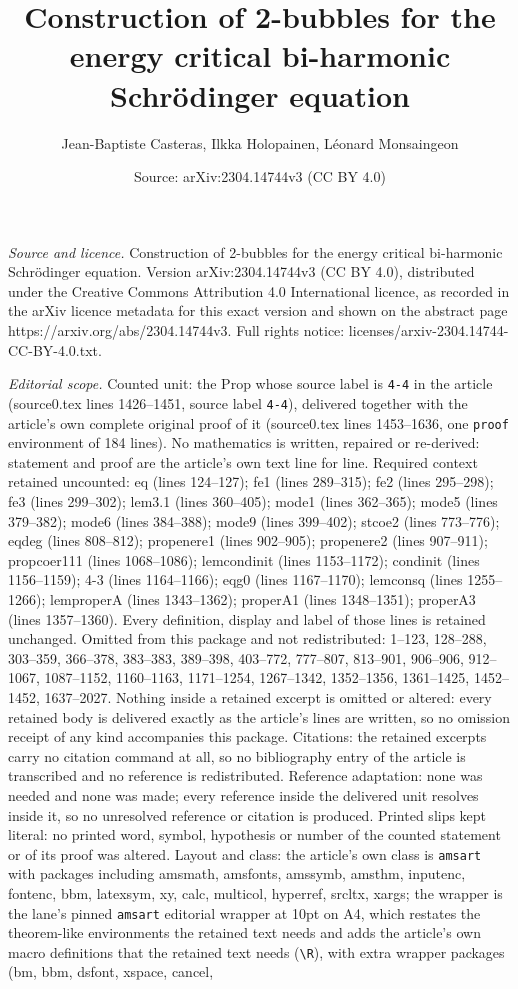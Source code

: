 \documentclass[10pt,a4paper]{amsart}
\title[Construction of 2-bubbles for the energy critical bi-harmoni]{Construction of 2-bubbles for the energy critical bi-harmonic Schr\"odinger equation}
\author{Jean-Baptiste Casteras, Ilkka Holopainen, L\'eonard Monsaingeon}
\date{Source: arXiv:2304.14744v3 (CC BY 4.0)}
\begin{document}
\maketitle

\noindent\emph{Source and licence.} Construction of 2-bubbles for the energy critical bi-harmonic Schr\"odinger equation. Version arXiv:2304.14744v3 (CC BY 4.0), distributed under the Creative Commons Attribution 4.0 International licence, as recorded in the arXiv licence metadata for this exact version and shown on the abstract page https://arxiv.org/abs/2304.14744v3. Full rights notice: licenses/arxiv-2304.14744-CC-BY-4.0.txt.\par\smallskip

\noindent\textit{Editorial scope.} Counted unit: the Prop whose source label is \texttt{4-4} in the article (source0.tex lines 1426--1451, source label \texttt{4-4}), delivered together with the article's own complete original proof of it (source0.tex lines 1453--1636, one \texttt{proof} environment of 184 lines). No mathematics is written, repaired or re-derived: statement and proof are the article's own text line for line. Required context retained uncounted: eq (lines 124--127); fe1 (lines 289--315); fe2 (lines 295--298); fe3 (lines 299--302); lem3.1 (lines 360--405); mode1 (lines 362--365); mode5 (lines 379--382); mode6 (lines 384--388); mode9 (lines 399--402); stcoe2 (lines 773--776); eqdeg (lines 808--812); propenere1 (lines 902--905); propenere2 (lines 907--911); propcoer111 (lines 1068--1086); lemcondinit (lines 1153--1172); condinit (lines 1156--1159); 4-3 (lines 1164--1166); eqg0 (lines 1167--1170); lemconsq (lines 1255--1266); lemproperA (lines 1343--1362); properA1 (lines 1348--1351); properA3 (lines 1357--1360). Every definition, display and label of those lines is retained unchanged. Omitted from this package and not redistributed: 1--123, 128--288, 303--359, 366--378, 383--383, 389--398, 403--772, 777--807, 813--901, 906--906, 912--1067, 1087--1152, 1160--1163, 1171--1254, 1267--1342, 1352--1356, 1361--1425, 1452--1452, 1637--2027. Nothing inside a retained excerpt is omitted or altered: every retained body is delivered exactly as the article's lines are written, so no omission receipt of any kind accompanies this package. Citations: the retained excerpts carry no citation command at all, so no bibliography entry of the article is transcribed and no reference is redistributed. Reference adaptation: none was needed and none was made; every reference inside the delivered unit resolves inside it, so no unresolved reference or citation is produced. Printed slips kept literal: no printed word, symbol, hypothesis or number of the counted statement or of its proof was altered. Layout and class: the article's own class is \texttt{amsart} with packages including amsmath, amsfonts, amssymb, amsthm, inputenc, fontenc, bbm, latexsym, xy, calc, multicol, hyperref, srcltx, xargs; the wrapper is the lane's pinned \texttt{amsart} editorial wrapper at 10pt on A4, which restates the theorem-like environments the retained text needs and adds the article's own macro definitions that the retained text needs (\texttt{\textbackslash R}), with extra wrapper packages (bm, bbm, dsfont, xspace, cancel, 
\end{document}
